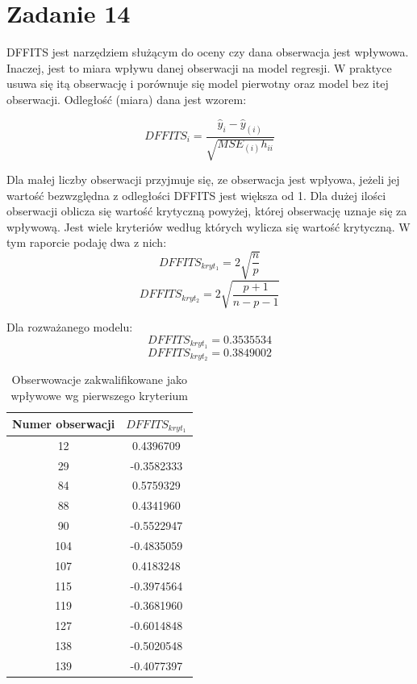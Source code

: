 \documentclass[9pt]{article}  %
\begin{document}
\section{Zadanie 14}

DFFITS jest narzędziem służącym do oceny czy dana obserwacja jest wpływowa. Inaczej, jest to miara wpływu danej obserwacji na model regresji. W praktyce usuwa się itą obserwację i porównuje się model pierwotny oraz model bez itej obserwacji. Odległość (miara) dana jest wzorem:

 $$ DFFITS_i = \frac{ \hat{y}_i - \hat{y}_{(i)} }{  \sqrt{MSE_{(i)} h_{ii}  } } $$

Dla małej liczby obserwacji przyjmuje się, ze obserwacja jest wpłyowa, jeżeli jej wartość bezwzględna z odległości DFFITS jest większa od 1. Dla dużej ilości obserwacji oblicza się wartość krytyczną powyżej, której obserwację uznaje się za wpływową. Jest wiele kryteriów według których wylicza się wartość krytyczną. W tym raporcie podaję dwa z nich:
$$  DFFITS_{kryt_1 } = 2\sqrt{ \frac{n}{p} } $$
$$  DFFITS_{kryt_2 } = 2\sqrt{ \frac{p+1}{n-p-1} } $$

Dla rozważanego modelu:
$$  DFFITS_{kryt_1 } = 0.3535534 $$
$$  DFFITS_{kryt_2 } = 0.3849002 $$


  
    \begin{table}[H]
  \centering
  \begin{tabular}{c|c}
     Numer obserwacji &  $DFFITS_{kryt_1 }$ \\ \hline
 12 & 0.4396709 \\
  29 & -0.3582333   \\
   84& 0.5759329   \\
   88& 0.4341960  \\
   90& -0.5522947  \\
   104& -0.4835059  \\
   107&  0.4183248  \\
   115& -0.3974564  \\
   119& -0.3681960  \\
   127& -0.6014848  \\
   138& -0.5020548  \\
   139& -0.4077397 \\
     
     
  \end{tabular} 
  \caption{Obserwowacje zakwalifikowane jako wpływowe wg pierwszego kryterium}
  \end{table}
\end{document}
